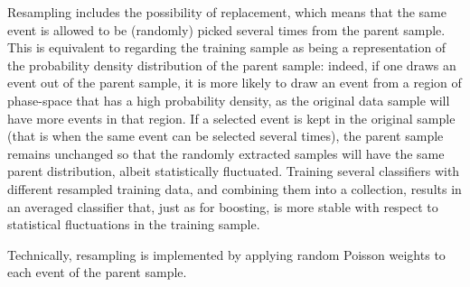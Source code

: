 Resampling includes the possibility of replacement, which means that the 
same event is allowed to be (randomly) picked several times from the parent
sample. This is equivalent to regarding the training sample as being a
representation of the probability density distribution of the parent
sample: indeed, if one draws an event out of the parent sample, it is more
likely to draw an event from a region of phase-space that has a high
probability density, as the original data sample will have more
events in that region. If a selected event is kept in the original
sample (that is when the same event can be selected several times),
the parent sample remains unchanged so that the randomly extracted
samples will have the same parent distribution, albeit statistically
fluctuated.  Training several classifiers with different resampled
training data, and combining them into a collection, results in an
averaged classifier that, just as for boosting, is more stable with
respect to statistical fluctuations in the training sample. 

Technically, resampling is implemented by applying random Poisson 
weights to each event of the parent sample. 


